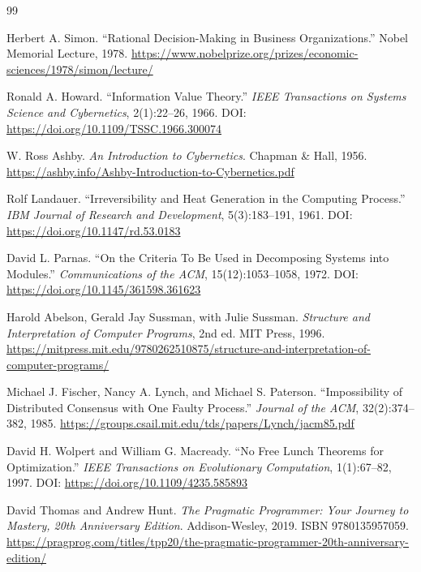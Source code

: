 \documentclass[11pt,a4paper]{ctexart}
\numberwithin{equation}{section}
\theoremstyle{definition}
\theoremstyle{plain}
\begin{document}
\begin{thebibliography}{99}

Herbert A. Simon.
\newblock ``Rational Decision-Making in Business Organizations.''
\newblock Nobel Memorial Lecture, 1978.
\newblock \url{https://www.nobelprize.org/prizes/economic-sciences/1978/simon/lecture/}

Ronald A. Howard.
\newblock ``Information Value Theory.''
\newblock \textit{IEEE Transactions on Systems Science and Cybernetics}, 2(1):22--26, 1966.
\newblock DOI: \url{https://doi.org/10.1109/TSSC.1966.300074}

W. Ross Ashby.
\newblock \textit{An Introduction to Cybernetics}.
\newblock Chapman \& Hall, 1956.
\newblock \url{https://ashby.info/Ashby-Introduction-to-Cybernetics.pdf}

Rolf Landauer.
\newblock ``Irreversibility and Heat Generation in the Computing Process.''
\newblock \textit{IBM Journal of Research and Development}, 5(3):183--191, 1961.
\newblock DOI: \url{https://doi.org/10.1147/rd.53.0183}

David L. Parnas.
\newblock ``On the Criteria To Be Used in Decomposing Systems into Modules.''
\newblock \textit{Communications of the ACM}, 15(12):1053--1058, 1972.
\newblock DOI: \url{https://doi.org/10.1145/361598.361623}

Harold Abelson, Gerald Jay Sussman, with Julie Sussman.
\newblock \textit{Structure and Interpretation of Computer Programs}, 2nd ed.
\newblock MIT Press, 1996.
\newblock \url{https://mitpress.mit.edu/9780262510875/structure-and-interpretation-of-computer-programs/}

Michael J. Fischer, Nancy A. Lynch, and Michael S. Paterson.
\newblock ``Impossibility of Distributed Consensus with One Faulty Process.''
\newblock \textit{Journal of the ACM}, 32(2):374--382, 1985.
\newblock \url{https://groups.csail.mit.edu/tds/papers/Lynch/jacm85.pdf}

David H. Wolpert and William G. Macready.
\newblock ``No Free Lunch Theorems for Optimization.''
\newblock \textit{IEEE Transactions on Evolutionary Computation}, 1(1):67--82, 1997.
\newblock DOI: \url{https://doi.org/10.1109/4235.585893}

David Thomas and Andrew Hunt.
\newblock \textit{The Pragmatic Programmer: Your Journey to Mastery, 20th Anniversary Edition}.
\newblock Addison-Wesley, 2019.
\newblock ISBN 9780135957059.
\newblock \url{https://pragprog.com/titles/tpp20/the-pragmatic-programmer-20th-anniversary-edition/}


\end{thebibliography}
\end{document}
